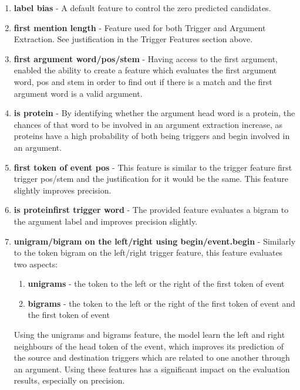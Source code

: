 \documentclass{article} %
\begin{document}
\begin{enumerate}

\item \textbf{label bias} - A default feature to control the zero predicted candidates.

\item \textbf{first mention length} - Feature used for both Trigger and Argument Extraction. See justification in the Trigger Features section above.

\item \textbf{first argument word/pos/stem} - Having access to the first argument, enabled the ability to create a feature which evaluates the first argument word, pos and stem in order to find out if there is a match and the first argument word is a valid argument.

\item \textbf{is protein\textunderscore} - By identifying whether the argument head word is a protein, the chances of that word to be involved in an argument extraction increase, as proteins have a high probability of both being triggers and begin involved in an argument.

\item \textbf{first token of event pos} - This feature is similar to the trigger feature first trigger pos/stem and the justification for it would be the same. This feature slightly improves precision.

\item \textbf{is protein\textunderscore first trigger word} - The provided feature evaluates a bigram to the argument label and improves precision slightly.

\item \textbf{unigram/bigram on the left/right using begin/event.begin} - Similarly to the token bigram on the left/right trigger feature, this feature evaluates two aspects:
\begin{enumerate}
\item \textbf{unigrams} - the token to the left or the right of the first token of event
\item \textbf{bigrams}  - the token to the left or the right of the first token of event and the first token of event
\end{enumerate}

Using the unigrams and bigrams feature, the model learn the left and right neighbours of the head token of the event, which improves its prediction of the source and destination triggers which are related to one another through an argument. Using these features has a significant impact on the evaluation results, especially on precision.


\end{enumerate}
\end{document}
